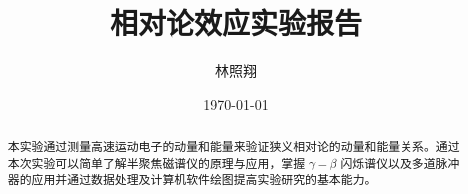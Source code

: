 \documentclass[aps,prl,preprint,groupedaddress]{revtex4-2}
\begin{document}
\renewcommand{\thesection}{\Roman{section}}

\title{相对论效应实验报告}


\author{林照翔}


\date{\today}

\begin{abstract}
本实验通过测量高速运动电子的动量和能量来验证狭义相对论的动量和能量关系。通过本次实验可以简单了解半聚焦磁谱仪的原理与应用，掌握 $\gamma-\beta $ 闪烁谱仪以及多道脉冲器的应用并通过数据处理及计算机软件绘图提高实验研究的基本能力。

\end{abstract}


\maketitle
\end{document}
